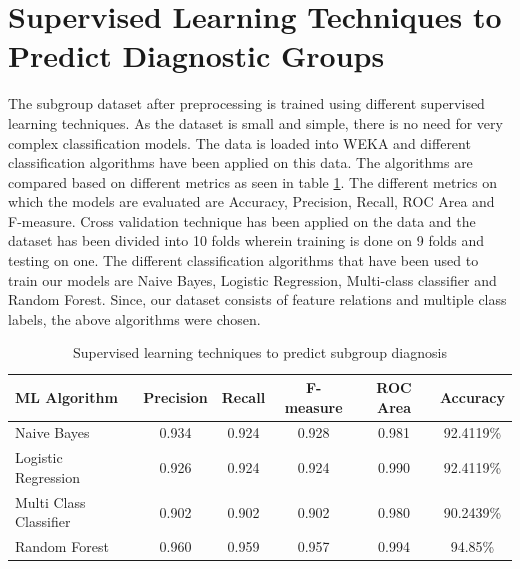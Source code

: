 \section{Supervised Learning Techniques to Predict Diagnostic Groups}
The subgroup dataset after preprocessing is trained using different supervised learning techniques. As the dataset is small and simple, there is no need for very complex classification models. The data is loaded into WEKA and different classification algorithms have been applied on this data. The algorithms are compared based on different metrics as seen in table \ref{table:41}. The different metrics on which the models are evaluated are Accuracy, Precision, Recall, ROC Area and F-measure. Cross validation technique has been applied on the data and the dataset has been divided into 10 folds wherein training is done on 9 folds and testing on one. The different classification algorithms that have been used to train our models are Naive Bayes, Logistic Regression, Multi-class classifier and Random Forest. Since, our dataset consists of feature relations and multiple class labels, the above algorithms were chosen.
\begin{table}[h]
\begin{center}
\begin{tabular}{|l|c|c|c|c|c|}
\hline
\textbf{ML Algorithm} & \textbf{Precision}&	\textbf{Recall}&	\textbf{F-measure}&	\textbf{ROC Area}&	\textbf{Accuracy}\\
\hline \hline
Naive Bayes & 0.934 &	0.924 &	0.928 &	0.981& 	92.4119\%\\
\hline
Logistic Regression &	0.926&	0.924&	0.924&	0.990&	92.4119\%\\
\hline
Multi Class Classifier&	0.902&	0.902&	0.902&	0.980&	90.2439\%\\
\hline
Random Forest&	0.960	&0.959	&0.957	&0.994&	94.85\%\\
\hline
\end{tabular}
\end{center}
\caption{Supervised learning techniques to predict subgroup diagnosis}
\label{table:41}
\end{table}

